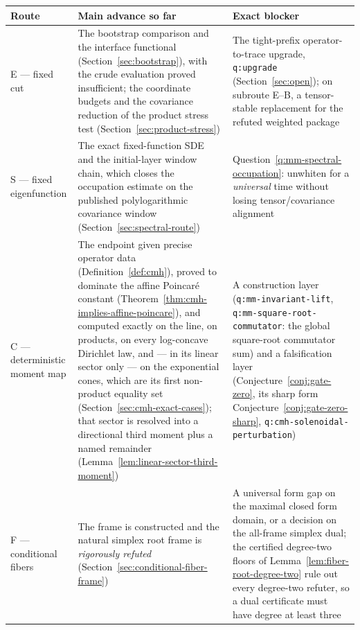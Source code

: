 \documentclass[../../main.tex]{subfiles}
\begin{document}
\begin{center}
\begin{tabularx}{\textwidth}{@{}>{\raggedright\arraybackslash}p{}Y>{\raggedright\arraybackslash}p{0.34\textwidth}@{}}
\toprule
Route & Main advance so far & Exact blocker \\
\midrule
E --- fixed cut & The bootstrap comparison and the interface functional
(Section~\ref{sec:bootstrap}), with the crude evaluation proved insufficient; the coordinate
budgets and the covariance reduction of the product stress test
(Section~\ref{sec:product-stress}) &
The tight-prefix operator-to-trace upgrade, \texttt{q:upgrade}
(Section~\ref{sec:open}); on subroute E--B, a tensor-stable replacement for the refuted weighted
package \\
\addlinespace
S --- fixed eigenfunction & The exact fixed-function SDE and the initial-layer window chain, which
closes the occupation estimate on the published polylogarithmic covariance window
(Section~\ref{sec:spectral-route}) &
Question~\ref{q:mm-spectral-occupation}: unwhiten for a \emph{universal} time without losing
tensor/covariance alignment \\
\addlinespace
C --- deterministic moment map & The endpoint given precise operator data
(Definition~\ref{def:cmh}), proved to dominate the affine Poincar\'e constant
(Theorem~\ref{thm:cmh-implies-affine-poincare}), and computed exactly on the line, on products,
on every log-concave Dirichlet law, and --- in its linear sector only --- on the exponential
cones, which are its first non-product equality set
(Section~\ref{sec:cmh-exact-cases}); that sector is resolved into a directional third moment
plus a named remainder (Lemma~\ref{lem:linear-sector-third-moment}) &
A construction layer (\texttt{q:mm-invariant-lift}, \texttt{q:mm-square-root-commutator}: the
global square-root commutator sum) and a falsification layer
(Conjecture~\ref{conj:gate-zero}, its sharp form Conjecture~\ref{conj:gate-zero-sharp},
\texttt{q:cmh-solenoidal-perturbation}) \\
\addlinespace
F --- conditional fibers & The frame is constructed and the natural simplex root frame is
\emph{rigorously refuted} (Section~\ref{sec:conditional-fiber-frame}) &
A universal form gap on the maximal closed form domain, or a decision on the all-frame simplex
dual; the certified degree-two floors of Lemma~\ref{lem:fiber-root-degree-two} rule out every
degree-two refuter, so a dual certificate must have degree at least three \\
\bottomrule
\end{tabularx}
\end{center}
\end{document}
